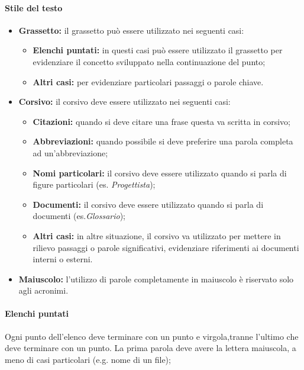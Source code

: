 		\paragraph{Stile del testo}
		\begin{itemize}
		\item \textbf{Grassetto:} il grassetto può essere utilizzato nei seguenti casi:
			\begin{itemize}
			\item \textbf{Elenchi puntati:} in questi casi può essere utilizzato il grassetto per evidenziare il concetto sviluppato nella continuazione del punto;
			\item \textbf{Altri casi:} per evidenziare particolari passaggi o parole chiave.
			\end{itemize}
		
		\item \textbf{Corsivo:} il corsivo deve essere utilizzato nei seguenti casi:
			\begin{itemize}
				\item \textbf{Citazioni:} quando si deve citare una frase questa va scritta in corsivo;
				\item \textbf{Abbreviazioni:} quando possibile si deve preferire una parola completa ad un’abbreviazione;
				\item \textbf{Nomi particolari:} il corsivo deve essere utilizzato quando si parla di figure particolari (es. \textit{Progettista});
				\item \textbf{Documenti:} il corsivo deve essere utilizzato quando si parla di documenti (es.\textit{Glossario});
				\item \textbf{Altri casi:} in altre situazione, il corsivo va utilizzato per mettere in rilievo passaggi o parole significativi, evidenziare riferimenti ai documenti interni o esterni.
			\end{itemize}
		
		\item \textbf{Maiuscolo:} l’utilizzo di parole completamente in maiuscolo è riservato solo agli acronimi.
		
		\end{itemize}
		
		\paragraph{Elenchi puntati} \Spazio
		Ogni punto dell’elenco deve terminare con un punto e virgola,tranne l’ultimo che deve terminare con un punto. La prima parola deve avere la lettera maiuscola, a meno di casi particolari (e.g. nome di un file);
		

